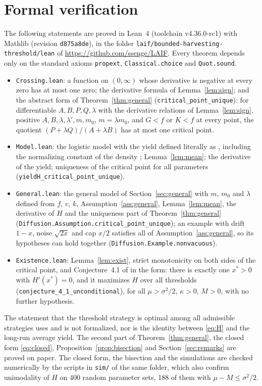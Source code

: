 \documentclass[11pt]{article}
\theoremstyle{definition}
\begin{document}
\section{Formal verification}\label{sec:lean}

\begin{sloppypar}
The following statements are proved in Lean~4 (toolchain v4.36.0-rc1) with Mathlib (revision
\texttt{d875a8de}), in the folder \texttt{laif/bounded-harvesting-threshold/lean} of
\url{https://github.com/ssenge/LAIF}. Every theorem depends only on the standard axioms \texttt{propext},
\texttt{Classical.choice} and \texttt{Quot.sound}.
\end{sloppypar}
\begin{itemize}
\item \texttt{Crossing.lean}: a function on $(0,\infty)$ whose derivative is negative at every zero has at most
one zero; the derivative formula of Lemma~\ref{lem:sign}; and the abstract form of Theorem~\ref{thm:general}
(\texttt{critical\_point\_unique}): for differentiable $A, B, P, Q, \lambda$ with the derivative relations of
Lemma~\ref{lem:sign}, positive $A, B, \lambda, \lambda', m, m_0$, $m = \lambda m_0$, and $G < f$ or $K < f$ at every
point, the quotient $(P + \lambda Q)/(A + \lambda B)$ has at most one critical point.
\item \texttt{Model.lean}: the logistic model with the yield defined literally as \cite[eq.~(4.4)]{hening19},
including the normalizing constant of the density \cite[eq.~(4.3)]{hening19}; Lemma~\ref{lem:mean}; the
derivative of the yield; uniqueness of the critical point for all parameters
(\texttt{yieldH\_critical\_point\_unique}).
\item \texttt{General.lean}: the general model of Section~\ref{sec:general} with $m$, $m_0$ and $\lambda$
defined from $f$, $v$, $k$, Assumption~\ref{ass:general}, Lemma~\ref{lem:mean}, the derivative of $H$ and the
uniqueness part of Theorem~\ref{thm:general} (\texttt{Diffusion.Assumption.critical\_point\_unique}); an example
with drift $1 - x$, noise $\sqrt{2x}$ and cap $x/2$ satisfies all of Assumption~\ref{ass:general}, so its
hypotheses can hold together (\texttt{Diffusion.Example.nonvacuous}).
\item \texttt{Existence.lean}: Lemma~\ref{lem:exist}, strict monotonicity on both sides of the critical point,
and Conjecture~4.1 of \cite{hening19} in the form: there is exactly one $x^* > 0$ with $H'(x^*) = 0$, and it
maximizes $H$ over all thresholds (\texttt{conjecture\_4\_1\_unconditional}), for all $\mu > \sigma^2/2$,
$\kappa > 0$, $M > 0$, with no further hypothesis.
\end{itemize}
The statement that the threshold strategy is optimal among all admissible strategies uses
\cite[Theorem~2.1]{hening19} and is not formalized, nor is the identity between \eqref{eq:H} and the long-run
average yield. The second part of Theorem~\ref{thm:general}, the closed form \eqref{eq:closed},
Proposition~\ref{prop:bisection} and Section~\ref{sec:remarks} are proved on paper. The closed form, the
bisection and the simulations are checked numerically by the scripts in \texttt{sim/} of the same folder, which
also confirm unimodality of $H$ on 400 random parameter sets, 188 of them with $\mu - M \le \sigma^2/2$.
\end{document}
